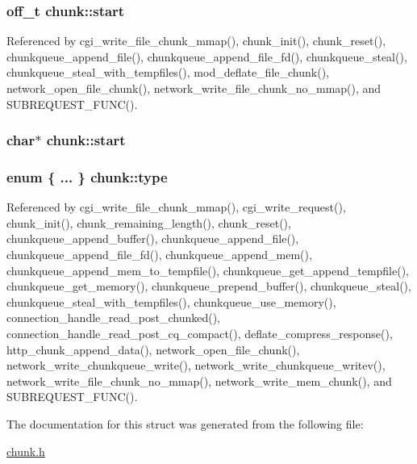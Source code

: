 \hypertarget{structchunk_a974ac929e1f3354e364ecba347170ef2}{
\subsubsection[{start}]{\setlength{\rightskip}{0pt plus 5cm}off\-\_\-t chunk\-::start}}\label{structchunk_a974ac929e1f3354e364ecba347170ef2}


Referenced by cgi\-\_\-write\-\_\-file\-\_\-chunk\-\_\-mmap(), chunk\-\_\-init(), chunk\-\_\-reset(), chunkqueue\-\_\-append\-\_\-file(), chunkqueue\-\_\-append\-\_\-file\-\_\-fd(), chunkqueue\-\_\-steal(), chunkqueue\-\_\-steal\-\_\-with\-\_\-tempfiles(), mod\-\_\-deflate\-\_\-file\-\_\-chunk(), network\-\_\-open\-\_\-file\-\_\-chunk(), network\-\_\-write\-\_\-file\-\_\-chunk\-\_\-no\-\_\-mmap(), and S\-U\-B\-R\-E\-Q\-U\-E\-S\-T\-\_\-\-F\-U\-N\-C().

\hypertarget{structchunk_a39e462c7efb61de24faa0c3956966399}{
\subsubsection[{start}]{\setlength{\rightskip}{0pt plus 5cm}char$\ast$ chunk\-::start}}\label{structchunk_a39e462c7efb61de24faa0c3956966399}
\hypertarget{structchunk_a382b377c9ed1acd324d8de01a5fc33ed}{
\subsubsection[{type}]{\setlength{\rightskip}{0pt plus 5cm}enum \{ ... \}   chunk\-::type}}\label{structchunk_a382b377c9ed1acd324d8de01a5fc33ed}


Referenced by cgi\-\_\-write\-\_\-file\-\_\-chunk\-\_\-mmap(), cgi\-\_\-write\-\_\-request(), chunk\-\_\-init(), chunk\-\_\-remaining\-\_\-length(), chunk\-\_\-reset(), chunkqueue\-\_\-append\-\_\-buffer(), chunkqueue\-\_\-append\-\_\-file(), chunkqueue\-\_\-append\-\_\-file\-\_\-fd(), chunkqueue\-\_\-append\-\_\-mem(), chunkqueue\-\_\-append\-\_\-mem\-\_\-to\-\_\-tempfile(), chunkqueue\-\_\-get\-\_\-append\-\_\-tempfile(), chunkqueue\-\_\-get\-\_\-memory(), chunkqueue\-\_\-prepend\-\_\-buffer(), chunkqueue\-\_\-steal(), chunkqueue\-\_\-steal\-\_\-with\-\_\-tempfiles(), chunkqueue\-\_\-use\-\_\-memory(), connection\-\_\-handle\-\_\-read\-\_\-post\-\_\-chunked(), connection\-\_\-handle\-\_\-read\-\_\-post\-\_\-cq\-\_\-compact(), deflate\-\_\-compress\-\_\-response(), http\-\_\-chunk\-\_\-append\-\_\-data(), network\-\_\-open\-\_\-file\-\_\-chunk(), network\-\_\-write\-\_\-chunkqueue\-\_\-write(), network\-\_\-write\-\_\-chunkqueue\-\_\-writev(), network\-\_\-write\-\_\-file\-\_\-chunk\-\_\-no\-\_\-mmap(), network\-\_\-write\-\_\-mem\-\_\-chunk(), and S\-U\-B\-R\-E\-Q\-U\-E\-S\-T\-\_\-\-F\-U\-N\-C().



The documentation for this struct was generated from the following file\-:\begin{DoxyCompactItemize}
\item 
\hyperlink{chunk_8h}{chunk.\-h}\end{DoxyCompactItemize}
